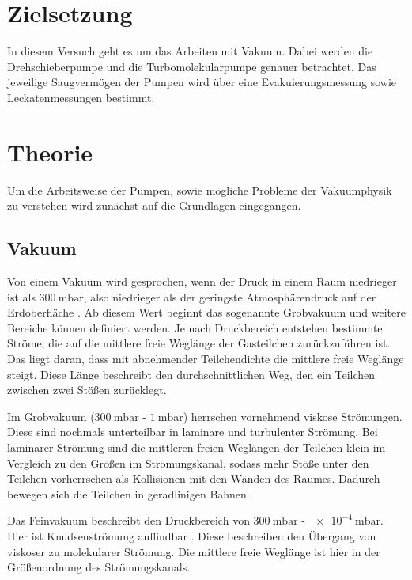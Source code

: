 \section{Zielsetzung}
    In diesem Versuch geht es um das Arbeiten mit Vakuum.
    Dabei werden die Drehschieberpumpe und die Turbomolekularpumpe genauer betrachtet.
    Das jeweilige Saugvermögen der Pumpen wird über eine Evakuierungsmessung sowie Leckatenmessungen bestimmt.

\section{Theorie}
\label{sec:Theorie}
    Um die Arbeitsweise der Pumpen, sowie mögliche Probleme der Vakuumphysik zu verstehen wird zunächst auf die Grundlagen eingegangen.
    \subsection{Vakuum}
        Von einem Vakuum wird gesprochen, wenn der Druck in einem Raum niedrieger ist als $\SI{300}{\milli\bar}$, also niedrieger als der geringste Atmosphärendruck auf der Erdoberfläche \cite{Pfeiffer}.
        Ab diesem Wert beginnt das sogenannte Grobvakuum und weitere Bereiche können definiert werden.
        Je nach Druckbereich entstehen bestimmte Ströme, die auf die mittlere freie Weglänge der Gasteilchen zurückzuführen ist.
        Das liegt daran, dass mit abnehmender Teilchendichte die mittlere freie Weglänge steigt.
        Diese Länge beschreibt den durchschnittlichen Weg, den ein Teilchen zwischen zwei Stößen zurücklegt. 

        \noindent
        Im Grobvakuum ($\SI{300}{\milli\bar}$ - $\SI{1}{\milli\bar}$) herrschen vornehmend viskose Strömungen.
        Diese sind nochmals unterteilbar in laminare und turbulenter Strömung.
        Bei laminarer Strömung sind die mittleren freien Weglängen der Teilchen klein im Vergleich zu den Größen im Strömungskanal, sodass mehr Stöße unter den Teilchen vorherrschen als Kollisionen mit den Wänden des Raumes.
        Dadurch bewegen sich die Teilchen in geradlinigen Bahnen.

        \noindent
        Das Feinvakuum beschreibt den Druckbereich von $\SI{300}{\milli\bar}$ - $\SI{e-4}{\milli\bar}$.
        Hier ist Knudsenströmung auffindbar \cite{Pfeiffer}.
        Diese beschreiben den Übergang von viskoser zu molekularer Strömung.
        Die mittlere freie Weglänge ist hier in der Größenordnung des Strömungskanals.

